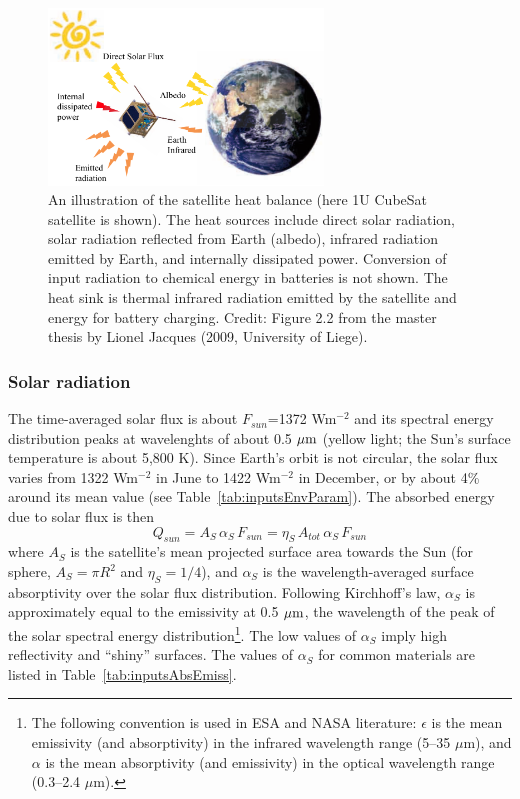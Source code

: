\documentclass[]{aastex62}
\def\eq#1{\begin{equation} #1 \end{equation}}
\def\mic              {\hbox{$\mu\mathrm{m}$}}
\begin{document}
 

\begin{figure}[t]
\centering
\includegraphics[width=0.65\textwidth, keepaspectratio]{figures/Jacques_heatSources.png} 
\caption{An illustration of the satellite heat balance (here 1U CubeSat satellite is shown). 
The heat sources include direct solar radiation, solar radiation reflected from Earth (albedo), 
infrared radiation emitted by Earth, and internally dissipated power. Conversion of input
radiation to chemical energy in batteries is not shown. The heat sink is thermal infrared radiation 
emitted by the satellite and energy for battery charging. Credit: Figure 2.2 from the master thesis 
by Lionel Jacques (2009, University of Liege). 
\label{fig:JacquesFig22}}
\end{figure}


\subsubsection{Solar radiation} 

The time-averaged solar flux is about $F_{sun}$=1372 Wm$^{-2}$ and its spectral energy distribution peaks 
at wavelenghts of about 0.5 $\mic$ (yellow light; the Sun's surface temperature is about 5,800 K). Since 
Earth's orbit is not circular, the solar flux varies from 1322 Wm$^{-2}$ in June to 1422 Wm$^{-2}$ in December, 
or by about 4\% around its mean value (see Table~\ref{tab:inputsEnvParam}). The absorbed energy due to 
solar flux is then 
\eq{
\label{eq:Qsun}
                   Q_{sun}  = A_S \, \alpha_S  \, F_{sun} = \eta_S \, A_{tot} \, \alpha_S  \, F_{sun} 
} 
where  $A_S$ is the satellite's mean projected surface area towards the Sun (for sphere, $A_S = \pi R^2$ and
$\eta_S=1/4$), and $\alpha_S$ is the wavelength-averaged surface absorptivity over the solar flux distribution. 
Following Kirchhoff's law, $\alpha_S$ is approximately equal to the emissivity at 0.5 $\mic$, the wavelength 
of the peak of the solar spectral energy distribution\footnote{The following convention is used in ESA and NASA 
literature: $\epsilon$ is the mean emissivity (and absorptivity) in the infrared wavelength range (5--35 \mic), 
and $\alpha$ is the mean absorptivity (and emissivity) in the optical wavelength range (0.3--2.4 \mic).}. The low 
values of $\alpha_S$ imply high reflectivity and ``shiny'' surfaces. The values of  $\alpha_S$ for common 
materials are listed in Table~\ref{tab:inputsAbsEmiss}. 
 
\end{document}
